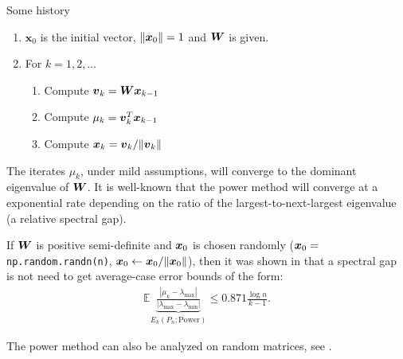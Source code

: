 \documentclass[9pt,aspectratio=169]{beamer}
\begin{document}
\begin{frame}{Some history}
    \hspace{2in}
\begin{enumerate}
    \item $\boldsymbol x_0$ is the initial vector, $\|{\boldsymbol x}_0\| = 1$ and ${\boldsymbol W}$ is given.
    \item For $k = 1,2,\ldots$
    \begin{enumerate}
        \item Compute ${\boldsymbol v}_k = {\boldsymbol W} {\boldsymbol x}_{k-1}$
        \item Compute $\mu_k = {\boldsymbol v}_k^T {\boldsymbol x}_{k-1}$
        \item Compute ${\boldsymbol x}_k = {\boldsymbol v}_k/\|{\boldsymbol v}_k\|$
    \end{enumerate}
\end{enumerate}


The iterates $\mu_k$, under mild assumptions, will converge to the dominant eigenvalue of ${\boldsymbol W}$.  It is well-known that the power method will converge at a exponential rate depending on the ratio of the largest-to-next-largest eigenvalue (a relative spectral gap). 
\end{frame}


\begin{frame}
\vspace{.1in}  If ${\boldsymbol W}$ is positive semi-definite and ${\boldsymbol x}_0$ is chosen randomly (${\boldsymbol x}_0 = $ {\tt np.random.randn(n)}, ${\boldsymbol x}_0 \leftarrow {\boldsymbol x}_0/\|{\boldsymbol x}_0\|$), then it was shown in \cite{Kuczynski1992} that a spectral gap is not need to get average-case error bounds of the form:
\begin{align*}
 \mathbb E \underbrace{\frac{|\mu_k - \lambda_{\max}|}{|\lambda_{\max} - \lambda_{\min}|}}_{E_k(P_n;\mathrm{Power})} \leq 0.871 \frac{\log n}{k -1}.
\end{align*}


The power method can also be analyzed on random matrices, see \cite{Kostlan1988,Deift2017}.
\end{frame}
\end{document}
